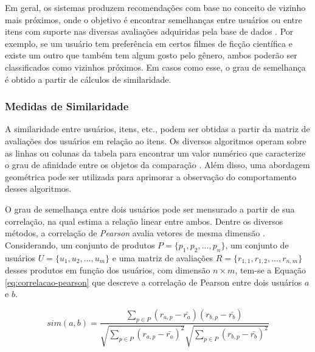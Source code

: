         Em geral, os sistemas produzem recomendações com base no conceito de vizinho mais próximos, onde o objetivo é encontrar semelhanças entre usuários ou entre itens com suporte nas diversas avaliações adquiridas pela base de dados \cite{Mustafa2017}. Por exemplo, se um usuário tem preferência em certos filmes de ficção científica e existe um outro que também tem algum gosto pelo gênero, ambos poderão ser classificados como vizinhos próximos. Em casos como esse, o grau de semelhança é obtido a partir de cálculos de similaridade.
        
        \ProximoForaDoSumario
        \subsubsection{Medidas de Similaridade} \label{sssec:similaridade}
        
        A similaridade entre usuários, itens, etc., podem ser obtidas a partir da matriz de avaliações dos usuários em relação ao itens. Os diversos algoritmos operam sobre as linhas ou colunas da tabela para encontrar um valor numérico que caracterize o grau de afinidade entre os objetos da comparação \cite{Aggarwal2016}. Além disso, uma abordagem geométrica \cite{Jones1987} pode ser utilizada para aprimorar a observação do comportamento desses algoritmos.
        
        O grau de semelhança entre dois usuários pode ser mensurado a partir de sua correlação, na qual estima a relação linear entre ambos. Dentre os diversos métodos, a correlação de \textit{Pearson} avalia vetores de mesma dimensão \cite{Ricci2010}. Considerando, um conjunto de produtos $P=\{p_1, p_2, ..., p_n\}$, um conjunto de usuários $U = \{u_1, u_2, ..., u_m\}$ e uma matriz de avaliações $R=\{r_{1,1}, r_{1,2}, ..., r_{n, m}\}$ desses produtos em função dos usuários, com dimensão  $n\times m$, tem-se a Equação \ref{eq:correlacao-pearson} que descreve a correlação de Pearson entre dois usuários $a$ e $b$.
             
        \begin{equation}
             sim(a, b) = \frac{\sum_{p\in P}(r_{a, p}-\bar{r_a})(r_{b, p}-\bar{r_b})}{\sqrt{\sum_{p\in P}(r_{a, p}-\bar{r_a})^2}\sqrt{\sum_{p\in P}(r_{b, p}-\bar{r_b})^2}}\label{eq:correlacao-pearson}
        \end{equation}
        
